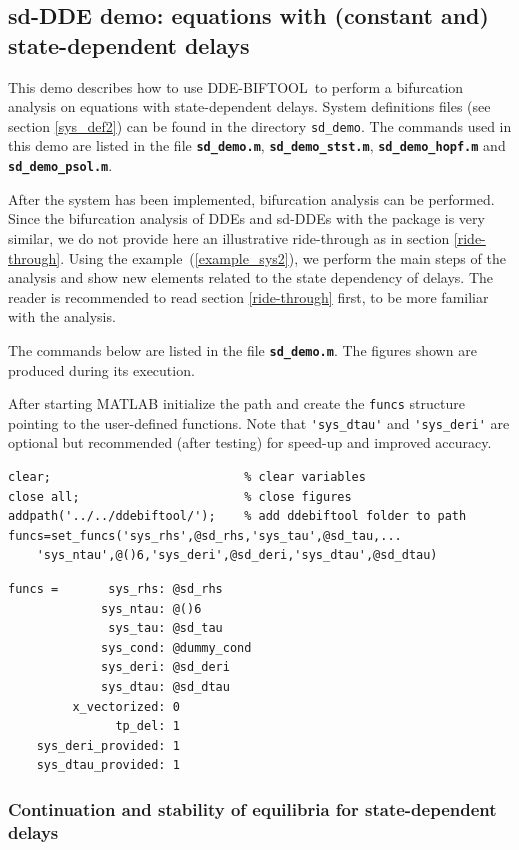 \documentclass[10pt]{scrartcl}
\newcommand{\DDEBIFCODE}{\textsc{DDE-BIFTOOL}}
\newcommand{\file}[1]{\textbf{\texttt{#1}}}
\newcommand{\blist}[1]{\mbox{\lstinline!#1!}}
\begin{document}
\subsection{sd-DDE demo: equations with (constant and) 
state-dependent delays}\label{demo2} 
This demo describes how to use \DDEBIFCODE\ to perform a bifurcation
analysis on equations with state-dependent delays.  System definitions
files (see section \ref{sys_def2}) can be found in the directory
\verb$sd_demo$.  The commands used in this demo are listed in the file
\file{sd\_demo.m}, \file{sd\_demo\_stst.m}, \file{sd\_demo\_hopf.m}
and \file{sd\_demo\_psol.m}.

After the system has been implemented, bifurcation analysis can be
performed.  Since the bifurcation analysis of DDEs and sd-DDEs with
the package is very similar, we do not provide here an illustrative
ride-through as in section \ref{ride-through}.  Using the
example~(\ref{example_sys2}), we perform the main steps of the
analysis and show new elements related to the state dependency of
delays.  The reader is recommended to read section \ref{ride-through}
first, to be more familiar with the analysis.

The commands below are listed in the file \file{sd\_demo.m}.
The figures shown are produced during its execution. 

After starting MATLAB initialize the path and create the \blist{funcs}
structure pointing to the user-defined functions. Note that
\blist{'sys_dtau'} and \blist{'sys_deri'} are optional but recommended
(after testing) for speed-up and improved accuracy.
\begin{lstlisting}
clear;                           % clear variables
close all;                       % close figures
addpath('../../ddebiftool/');    % add ddebiftool folder to path
funcs=set_funcs('sys_rhs',@sd_rhs,'sys_tau',@sd_tau,...
    'sys_ntau',@()6,'sys_deri',@sd_deri,'sys_dtau',@sd_dtau)
\end{lstlisting}
{\small
\begin{verbatim}
funcs =       sys_rhs: @sd_rhs
             sys_ntau: @()6
              sys_tau: @sd_tau
             sys_cond: @dummy_cond
             sys_deri: @sd_deri
             sys_dtau: @sd_dtau
         x_vectorized: 0
               tp_del: 1
    sys_deri_provided: 1
    sys_dtau_provided: 1
\end{verbatim}
}

\subsubsection{Continuation and stability of equilibria for
  state-dependent delays}
\label{sec:sd:stst}
\end{document}
